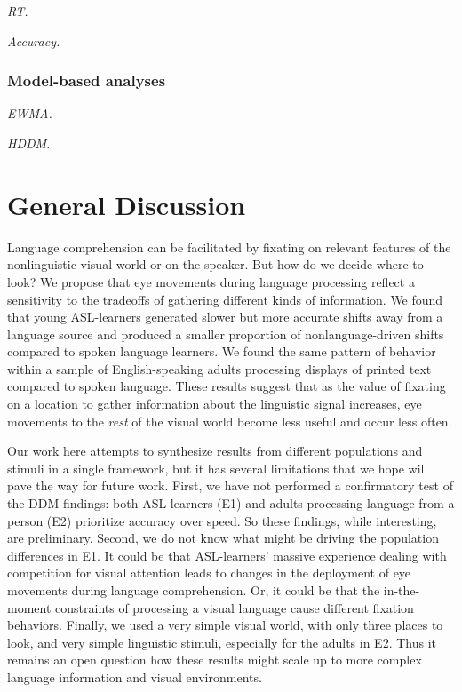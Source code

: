 \documentclass[10pt, letterpaper]{article}
\begin{document}
\emph{RT.}

\emph{Accuracy.}

\subsubsection{Model-based analyses}\label{model-based-analyses-1}

\emph{EWMA.}

\emph{HDDM.}

\section{General Discussion}\label{general-discussion}

Language comprehension can be facilitated by fixating on relevant
features of the nonlinguistic visual world or on the speaker. But how do
we decide where to look? We propose that eye movements during language
processing reflect a sensitivity to the tradeoffs of gathering different
kinds of information. We found that young ASL-learners generated slower
but more accurate shifts away from a language source and produced a
smaller proportion of nonlanguage-driven shifts compared to spoken
language learners. We found the same pattern of behavior within a sample
of English-speaking adults processing displays of printed text compared
to spoken language. These results suggest that as the value of fixating
on a location to gather information about the linguistic signal
increases, eye movements to the \emph{rest} of the visual world become
less useful and occur less often.

Our work here attempts to synthesize results from different populations
and stimuli in a single framework, but it has several limitations that
we hope will pave the way for future work. First, we have not performed
a confirmatory test of the DDM findings: both ASL-learners (E1) and
adults processing language from a person (E2) prioritize accuracy over
speed. So these findings, while interesting, are preliminary. Second, we
do not know what might be driving the population differences in E1. It
could be that ASL-learners' massive experience dealing with competition
for visual attention leads to changes in the deployment of eye movements
during language comprehension. Or, it could be that the in-the-moment
constraints of processing a visual language cause different fixation
behaviors. Finally, we used a very simple visual world, with only three
places to look, and very simple linguistic stimuli, especially for the
adults in E2. Thus it remains an open question how these results might
scale up to more complex language information and visual environments.
\end{document}
